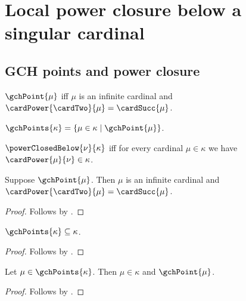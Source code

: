 \section{Local power closure below a singular cardinal}





\subsection{GCH points and power closure}

\begin{definition}\label{gch_point}
    $\gchPoint{\mu}$ iff $\mu$ is an infinite cardinal and
        $\cardPower{\cardTwo}{\mu}=\cardSucc{\mu}$.
\end{definition}

\begin{definition}\label{gch_points}
    $\gchPoints{\kappa}
        =\{\mu\in\kappa\mid \gchPoint{\mu}\}$.
\end{definition}

\begin{definition}\label{power_closed_below}
    $\powerClosedBelow{\nu}{\kappa}$ iff
        for every cardinal $\mu\in\kappa$ we have
            $\cardPower{\mu}{\nu}\in\kappa$.
\end{definition}

\begin{proposition}\label{gch_point_elim}
    Suppose $\gchPoint{\mu}$.
    Then $\mu$ is an infinite cardinal and
        $\cardPower{\cardTwo}{\mu}=\cardSucc{\mu}$.
\end{proposition}
\begin{proof}
    Follows by .
\end{proof}

\begin{proposition}\label{gch_points_subseteq}
    $\gchPoints{\kappa}\subseteq\kappa$.
\end{proposition}
\begin{proof}
    Follows by .
\end{proof}

\begin{proposition}\label{gch_points_elim}
    Let $\mu\in\gchPoints{\kappa}$.
    Then $\mu\in\kappa$ and $\gchPoint{\mu}$.
\end{proposition}
\begin{proof}
    Follows by .
\end{proof}

